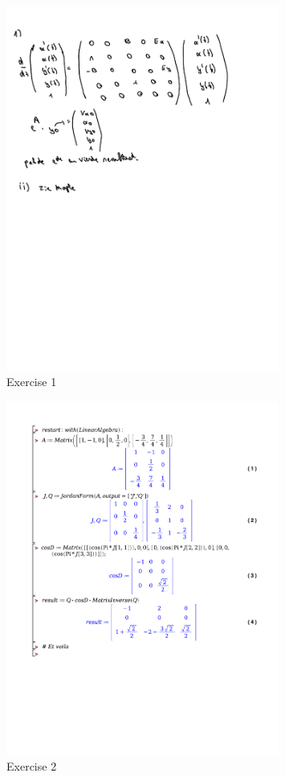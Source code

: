 \documentclass[a4paper]{report}
\begin{document}
\begin{figure}[H]
	\centering
	\includegraphics[width=0.8\textwidth]{assets/wc_3_ex_1.pdf}
	\caption{Exercise 1}
\end{figure}



\begin{figure}[H]
	\centering
	\includegraphics[width=0.8\textwidth]{exercises/wc_3_ex_2.pdf}
	\caption{Exercise 2}
	\label{fig:wc_3_ex_2}
\end{figure}
\end{document}
